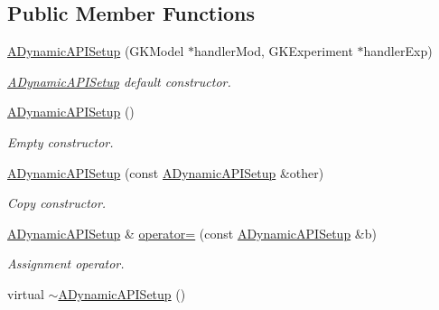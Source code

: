 \subsection*{Public Member Functions}
\begin{DoxyCompactItemize}
\item 
\hyperlink{classADynamicAPISetup_a58135747ce3f1e21d9f1e385e9f6a662}{A\+Dynamic\+A\+P\+I\+Setup} (G\+K\+Model $\ast$handler\+Mod, G\+K\+Experiment $\ast$handler\+Exp)
\begin{DoxyCompactList}\small\item\em \hyperlink{classADynamicAPISetup}{A\+Dynamic\+A\+P\+I\+Setup} default constructor. \end{DoxyCompactList}\item 
\hyperlink{classADynamicAPISetup_a34729d3bc53ff074d47f6425ab151e08}{A\+Dynamic\+A\+P\+I\+Setup} ()
\begin{DoxyCompactList}\small\item\em Empty constructor. \end{DoxyCompactList}\item 
\hyperlink{classADynamicAPISetup_a574eaf2330c8f790c7a613557d7792bf}{A\+Dynamic\+A\+P\+I\+Setup} (const \hyperlink{classADynamicAPISetup}{A\+Dynamic\+A\+P\+I\+Setup} \&other)
\begin{DoxyCompactList}\small\item\em Copy constructor. \end{DoxyCompactList}\item 
\hyperlink{classADynamicAPISetup}{A\+Dynamic\+A\+P\+I\+Setup} \& \hyperlink{classADynamicAPISetup_a18674582bd3f891a9cce6a764e4e158a}{operator=} (const \hyperlink{classADynamicAPISetup}{A\+Dynamic\+A\+P\+I\+Setup} \&b)
\begin{DoxyCompactList}\small\item\em Assignment operator. \end{DoxyCompactList}\item 
virtual \hyperlink{classADynamicAPISetup_a9da635df06b8f3e62b3e76e9805a8fbf}{$\sim$\+A\+Dynamic\+A\+P\+I\+Setup} ()\hypertarget{classADynamicAPISetup_a9da635df06b8f3e62b3e76e9805a8fbf}{}\label{classADynamicAPISetup_a9da635df06b8f3e62b3e76e9805a8fbf}


\end{DoxyCompactItemize}
